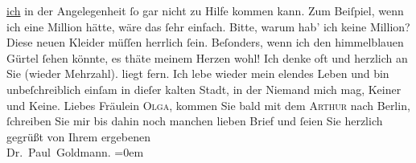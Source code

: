 \begin{ledgroupsized}[t]{13cm}
                  \uline{ich} in der Angelegenheit ſo gar nicht zu Hilfe
               kommen kann. Zum Beiſpiel, wenn ich eine Million hätte, wäre das ſehr einfach. Bitte,
               warum hab’ ich keine Million?\pend
           \pstart
           Diese neuen Kleider müſſen herrlich ſein. Beſonders, wenn ich den himmelblauen
               Gürtel ſehen könnte, es thäte meinem Herzen wohl!\pend
           \pstart
           Ich denke oft und herzlich an Sie (wieder Mehrzahl). \label{K_L03086-8v}\label{K_L03086-8h} liegt fern. Ich lebe wieder mein elendes Leben und bin unbeſchreiblich einſam
               in dieſer kalten Stadt, in der
               Niemand mich mag, Keiner und Keine.\pend
           \pstart
           {\pb}Liebes Fräulein \textsc{Olga},
               kommen Sie bald mit dem \textsc{Arthur} nach Berlin, ſchreiben Sie mir bis dahin noch manchen lieben Brief
               und ſeien Sie herzlich gegrüßt von\pend
           \pstart
            Ihrem ergebenen{\\[\baselineskip]}\spacefill\mbox{Dr. Paul Goldmann.}\pend
           \leftskip=0em{}
         
         \endnumbering{}\end{ledgroupsized}  \newcommand{\dateiname}{L03086}\newcommand{\titel}{Paul Goldmann an Arthur Schnitzler, Olga und Elisabeth Gussmann, 27. 9. [1901]}\newcommand{\editorInnen}{Martin Anton Müller und Laura Untner}
      